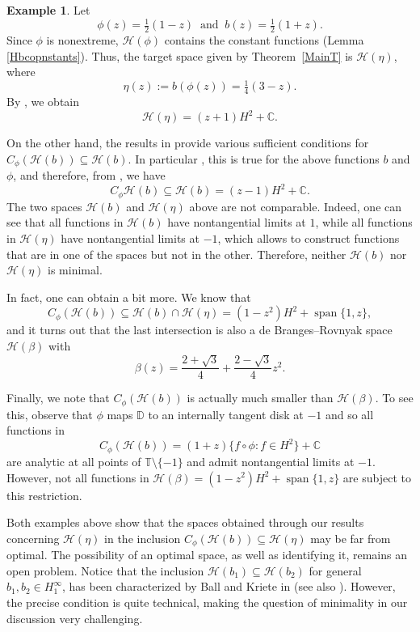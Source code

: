 \documentclass[11pt]{amsart}
\def\C{{\mathbb{C}}}
\def\D{\mathbb{D}}
\def\T{\mathbb{T}}
\def\HH{{\mathcal H}}
\renewcommand{\subset}{\subseteq}
\numberwithin{equation}{section}
\theoremstyle{plain}
\theoremstyle{definition}
\newtheorem{example}[equation]{Example}
\begin{document}
 
	\begin{example}
	Let
    $$ \phi(z)=\tfrac{1}{2} (1 - z) \; \; \mbox{and} \; \;  b(z)= \tfrac{1}{2} (1 + z).$$ Since $ \phi $ is nonextreme, $ \HH(\phi) $ contains the constant functions (Lemma \ref{Hbcopnstants}). Thus, the target space given by Theorem~\ref{MainT} is $\HH(\eta)$, where
		\[
		\eta(z):= b(\phi(z))= \tfrac{1}{4}(3-z).
		\]
By \cite[Thm.~1.6]{MR3503356}, we obtain 
    $$\HH(\eta)=(z+1)H^2+\C.$$

    
On the other hand, the results in \cite{MR4653340} provide various sufficient conditions for $ C_\phi(\HH(b))\subset \HH(b) $. In particular
	\cite[Cor.~4.12]{MR4653340}, this is true for the above functions $ b $ and $ \phi $, and therefore, from  \cite[Thm.~1.6]{MR3503356}, we have $$C_\phi \HH(b)\subset \HH(b)=(z-1)H^2+\C.$$
	The two spaces $ \HH(b) $ and $ \HH(\eta) $ above are not comparable. Indeed, one can see  that all functions in $ \HH(b) $ have nontangential limits at $ 1 $, while all functions in $ \HH(\eta) $ have nontangential limits at $ -1 $, which allows to construct functions that are in one of the spaces but not in the other. Therefore, neither $\HH(b)$ nor $\HH(\eta)$ is minimal. 
		
		In fact, one can obtain a bit more. We know \cite[Thm.~2.4]{FricainOstermann} that  $$ C_\phi(\HH(b))\subset \HH(b)\cap\HH(\eta) = (1 - z^2) H^2 + \operatorname{span}\{1, z\},$$ and it turns out  \cite[Thm.~1.6]{MR3503356} that the last intersection is also a de Branges--Rovnyak space $\HH(\beta)$ with
		\[
		\beta(z)=\frac{2+\sqrt{3}}{4}+\frac{2-\sqrt{3}}{4}z^2.
		\]


Finally, we note that  $C_{\phi}(\HH(b))$ is actually much smaller than $\HH(\beta)$. To see this, observe that $\phi$ maps $\D$ to an internally tangent disk at $-1$ and so all functions in 
$$C_{\phi}(\HH(b)) = (1 + z)\{f \circ \phi: f \in H^2\} + \C$$ are analytic at all points of $\T \setminus \{-1\}$ and admit nontangential limits at $-1$. However, not all functions in
$\HH(\beta) = (1 - z^2) H^2 + \operatorname{span}\{1, z\}$ are subject to this restriction.


Both examples above show that the spaces obtained through our results concerning $\HH(\eta)$ in the inclusion $C_{\phi} (\HH(b)) \subset \HH(\eta)$ may be far from optimal. The possibility
of an optimal space, as well as identifying it, remains an open problem. Notice that 
the inclusion $\HH(b_1) \subset \HH(b_2)$ for general $b_1, b_2 \in H^{\infty}_{1}$, has been characterized by Ball and Kriete in \cite{MR868573} (see also \cite[Ch.~27]{Hb2-book}). However, the precise condition is quite technical, making the question of minimality in our discussion very challenging. 
%
\end{example}
\end{document}
